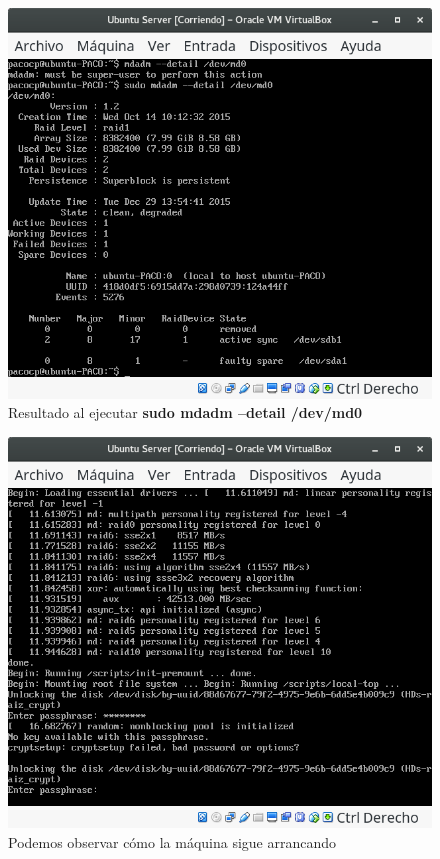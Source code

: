 \begin{figure}[H] %
	\centering
	\includegraphics[scale=0.5]{figuras/figura6.png}  %
	
	
	\caption{Resultado al ejecutar \textbf{sudo mdadm --detail /dev/md0}}
	\label{figura6}
\end{figure}

\begin{figure}[H] %
	\centering
	\includegraphics[scale=0.5]{figuras/figura8.png}  %
	
	
	\caption{Podemos observar cómo la máquina sigue arrancando}
	\label{figura8}
\end{figure}


